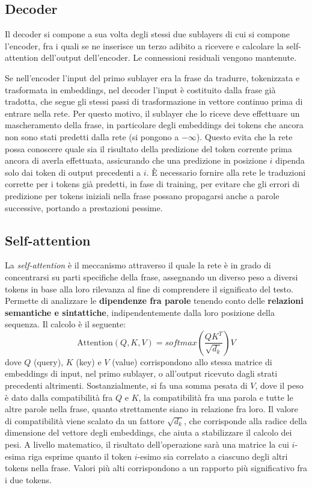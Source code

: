 \subsection{Decoder}
Il decoder si compone a sua volta degli stessi due sublayers di cui si compone l'encoder, fra i quali se ne inserisce un terzo adibito a ricevere e calcolare la self-attention dell'output dell'encoder. Le connessioni residuali vengono mantenute. 

Se nell'encoder l'input del primo sublayer era la frase da tradurre, tokenizzata e trasformata in embeddings, nel decoder l'input è costituito dalla frase già tradotta, che segue gli stessi passi di trasformazione in vettore continuo prima di entrare nella rete. Per questo motivo, il sublayer che lo riceve deve effettuare un mascheramento della frase, in particolare degli embeddings dei tokens che ancora non sono stati predetti dalla rete (si pongono a \(-\infty\)). Questo evita che la rete possa conoscere quale sia il risultato della predizione del token corrente prima ancora di averla effettuata, assicurando che una predizione in posizione \(i\) dipenda solo dai token di output precedenti a \(i\). È necessario fornire alla rete le traduzioni corrette per i tokens già predetti, in fase di training, per evitare che gli errori di predizione per tokens iniziali nella frase possano propagarsi anche a parole successive, portando a prestazioni pessime.

\subsection{Self-attention}
\label{self-attention}
La \textit{self-attention} è il meccanismo attraverso il quale la rete è in grado di concentrarsi su parti specifiche della frase, assegnando un diverso peso a diversi tokens in base alla loro rilevanza al fine di comprendere il significato del testo. Permette di analizzare le \textbf{dipendenze fra parole} tenendo conto delle \textbf{relazioni semantiche e sintattiche}, indipendentemente dalla loro posizione della sequenza.
Il calcolo è il seguente:
\[\text{Attention}(Q, K, V) = softmax(\frac{Q K^T}{\sqrt{d_k}})V\]
dove \(Q\) (query), \(K\) (key) e \(V\) (value) corrispondono allo stessa matrice di embeddings di input, nel primo sublayer, o all'output ricevuto dagli strati precedenti altrimenti. Sostanzialmente, si fa una somma pesata di \(V\), dove il peso è dato dalla compatibilità fra \(Q\) e \(K\), la compatibilità fra una parola e tutte le altre parole nella frase, quanto strettamente siano in relazione fra loro. Il valore di compatibilità viene scalato da un fattore \(\sqrt{d_k}\), che corrisponde alla radice della dimensione del vettore degli embeddings, che aiuta a stabilizzare il calcolo dei pesi.
A livello matematico, il risultato dell'operazione sarà una matrice la cui \(i\)-esima riga esprime quanto il token \(i\)-esimo sia correlato a ciascuno degli altri tokens nella frase. Valori più alti corrispondono a un rapporto più significativo fra i due tokens. 

